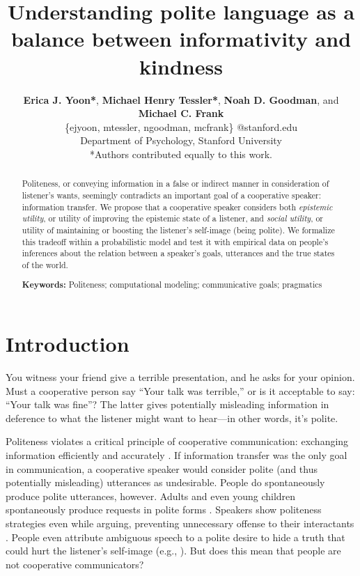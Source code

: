 \documentclass[10pt,letterpaper]{article}
\title{Understanding polite language as a balance between informativity and kindness}
\author{ {\large \bf Erica J. Yoon*}, {\large \bf Michael Henry Tessler*}, {\large \bf Noah D. Goodman}, and {\large \bf Michael C. Frank}   \\
\{ejyoon, mtessler, ngoodman, mcfrank\} @stanford.edu \\
  Department of Psychology, Stanford University \\
  *Authors contributed equally to this work.}
\begin{document}
\maketitle


\begin{abstract}

Politeness, or conveying information in a false or indirect manner in consideration of listener's wants,
seemingly contradicts an important goal of a cooperative speaker: information transfer.
We propose that a cooperative speaker considers both
\emph{epistemic utility}, or utility of improving the epistemic state of a listener,
and \emph{social utility}, or utility of maintaining or boosting the listener's self-image (being polite).
We formalize this tradeoff within a probabilistic model and test it with empirical data on people's inferences about the relation between a speaker's goals, utterances and the true states of the world.

\textbf{Keywords:}
Politeness; computational modeling; communicative goals; pragmatics

\end{abstract}


\section{Introduction}
You witness your friend give a terrible presentation, and he asks for your opinion.
Must a cooperative person say ``Your talk was terrible,'' or is it acceptable to say: ``Your talk was fine''?
The latter gives potentially misleading information in deference to what the listener might want to hear---in other words, it's polite.

Politeness violates a critical principle of cooperative communication: exchanging information efficiently and accurately \cite{Grice1975}.
If information transfer was the only goal in communication, a cooperative speaker would consider polite (and thus potentially misleading) utterances as undesirable.
People do spontaneously produce polite utterances, however.
Adults and even young children spontaneously produce requests in polite forms \cite{clark1980, axia1985}.
Speakers show politeness strategies even while arguing, preventing unnecessary offense to their interactants \cite{holtgraves1997}.
People even attribute ambiguous speech to a polite desire to hide a truth that could hurt the listener's self-image (e.g., ).
But does this mean that people are not cooperative communicators?
\end{document}
